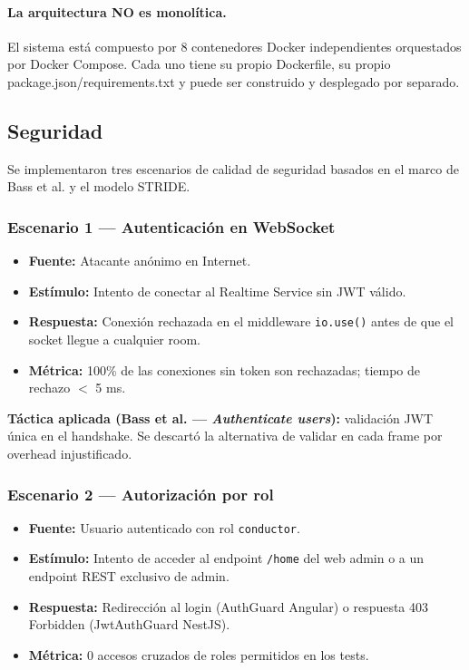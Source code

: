 \documentclass[12pt,a4paper,oneside]{article}
\begin{document}
\paragraph{La arquitectura NO es monol\'itica.} El sistema est\'a compuesto por 8 contenedores Docker independientes orquestados por Docker Compose. Cada uno tiene su propio Dockerfile, su propio package.json/requirements.txt y puede ser construido y desplegado por separado.

\subsection{Seguridad}

Se implementaron tres escenarios de calidad de seguridad basados en el marco de Bass et al. y el modelo STRIDE.

\subsubsection{Escenario 1 --- Autenticaci\'on en WebSocket}

\begin{itemize}[leftmargin=*]
  \item \textbf{Fuente:} Atacante an\'onimo en Internet.
  \item \textbf{Est\'imulo:} Intento de conectar al Realtime Service sin JWT v\'alido.
  \item \textbf{Respuesta:} Conexi\'on rechazada en el middleware \texttt{io.use()} antes de que el socket llegue a cualquier room.
  \item \textbf{M\'etrica:} 100\% de las conexiones sin token son rechazadas; tiempo de rechazo $<$ 5 ms.
\end{itemize}

\textbf{T\'actica aplicada (Bass et al. --- \emph{Authenticate users}):} validaci\'on JWT \'unica en el handshake. Se descart\'o la alternativa de validar en cada frame por overhead injustificado.

\subsubsection{Escenario 2 --- Autorizaci\'on por rol}

\begin{itemize}[leftmargin=*]
  \item \textbf{Fuente:} Usuario autenticado con rol \texttt{conductor}.
  \item \textbf{Est\'imulo:} Intento de acceder al endpoint \texttt{/home} del web admin o a un endpoint REST exclusivo de admin.
  \item \textbf{Respuesta:} Redirecci\'on al login (AuthGuard Angular) o respuesta 403 Forbidden (JwtAuthGuard NestJS).
  \item \textbf{M\'etrica:} 0 accesos cruzados de roles permitidos en los tests.
\end{itemize}
\end{document}

